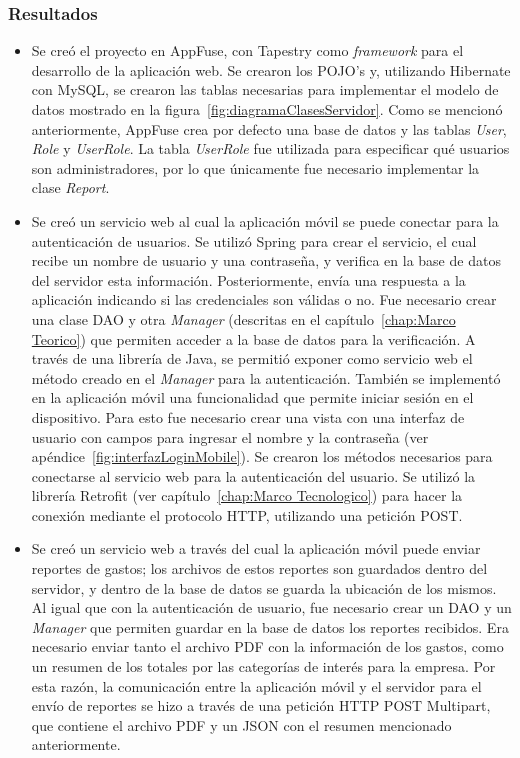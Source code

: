 \subsubsection{Resultados}
\begin{itemize}
\item Se creó el proyecto en AppFuse, con Tapestry como \textit{framework} para el desarrollo de la aplicación web. Se crearon los POJO's y, utilizando Hibernate con MySQL, se crearon las tablas necesarias para implementar el modelo de datos mostrado en la figura~\ref{fig:diagramaClasesServidor}. Como se mencionó anteriormente, AppFuse crea por defecto una base de datos y las tablas \textit{User}, \textit{Role} y \textit{UserRole}. La tabla \textit{UserRole} fue utilizada para especificar qué usuarios son administradores, por lo que únicamente fue necesario implementar la clase \textit{Report}.
\item Se creó un servicio web al cual la aplicación móvil se puede conectar para la autenticación de usuarios. Se utilizó Spring para crear el servicio, el cual recibe un nombre de usuario y una contraseña, y verifica en la base de datos del servidor esta información. Posteriormente, envía una respuesta a la aplicación indicando si las credenciales son válidas o no. Fue necesario crear una clase DAO y otra \textit{Manager} (descritas en el capítulo~\ref{chap:Marco Teorico}) que permiten acceder a la base de datos para la verificación. A través de una librería de Java, se permitió exponer como servicio web el método creado en el \textit{Manager} para la autenticación.
También se implementó en la aplicación móvil una funcionalidad que permite iniciar sesión en el dispositivo. Para esto fue necesario crear una vista con una interfaz de usuario con campos para ingresar el nombre y la contraseña (ver apéndice~\ref{fig:interfazLoginMobile}). Se crearon los métodos necesarios para conectarse al servicio web para la autenticación del usuario. Se utilizó la librería Retrofit (ver capítulo~\ref{chap:Marco Tecnologico}) para hacer la conexión mediante el protocolo HTTP, utilizando una petición POST.
\item Se creó un servicio web a través del cual la aplicación móvil puede enviar reportes de gastos; los archivos de estos reportes son guardados dentro del servidor, y dentro de la base de datos se guarda la ubicación de los mismos. Al igual que con la autenticación de usuario, fue necesario crear un DAO y un \textit{Manager} que permiten guardar en la base de datos los reportes recibidos. Era necesario enviar tanto el archivo PDF con la información de los gastos, como un resumen de los totales por las categorías de interés para la empresa. Por esta razón, la comunicación entre la aplicación móvil y el servidor para el envío de reportes se hizo a través de una petición HTTP POST Multipart, que contiene el archivo PDF y un JSON con el resumen mencionado anteriormente.


\end{itemize}
